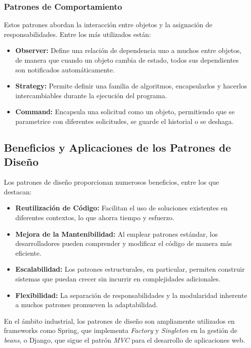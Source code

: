 \documentclass[12pt, a4paper, twocolumn]{article}
\begin{document}
\subsubsection{Patrones de Comportamiento}
Estos patrones abordan la interacción entre objetos y la asignación de responsabilidades. Entre los más utilizados están:
\begin{itemize}
    \item \textbf{Observer:} Define una relación de dependencia uno a muchos entre objetos, de manera que cuando un objeto cambia de estado, todos sus dependientes son notificados automáticamente.
    \item \textbf{Strategy:} Permite definir una familia de algoritmos, encapsularlos y hacerlos intercambiables durante la ejecución del programa.
    \item \textbf{Command:} Encapsula una solicitud como un objeto, permitiendo que se parametrice con diferentes solicitudes, se guarde el historial o se deshaga.
\end{itemize}

\subsection{Beneficios y Aplicaciones de los Patrones de Diseño}
Los patrones de diseño proporcionan numerosos beneficios, entre los que destacan:
\begin{itemize}
    \item \textbf{Reutilización de Código:} Facilitan el uso de soluciones existentes en diferentes contextos, lo que ahorra tiempo y esfuerzo.
    \item \textbf{Mejora de la Mantenibilidad:} Al emplear patrones estándar, los desarrolladores pueden comprender y modificar el código de manera más eficiente.
    \item \textbf{Escalabilidad:} Los patrones estructurales, en particular, permiten construir sistemas que puedan crecer sin incurrir en complejidades adicionales.
    \item \textbf{Flexibilidad:} La separación de responsabilidades y la modularidad inherente a muchos patrones promueven la adaptabilidad.
\end{itemize}

En el ámbito industrial, los patrones de diseño son ampliamente utilizados en frameworks como Spring, que implementa \textit{Factory} y \textit{Singleton} en la gestión de \textit{beans}, o Django, que sigue el patrón \textit{MVC} para el desarrollo de aplicaciones web.
\end{document}
